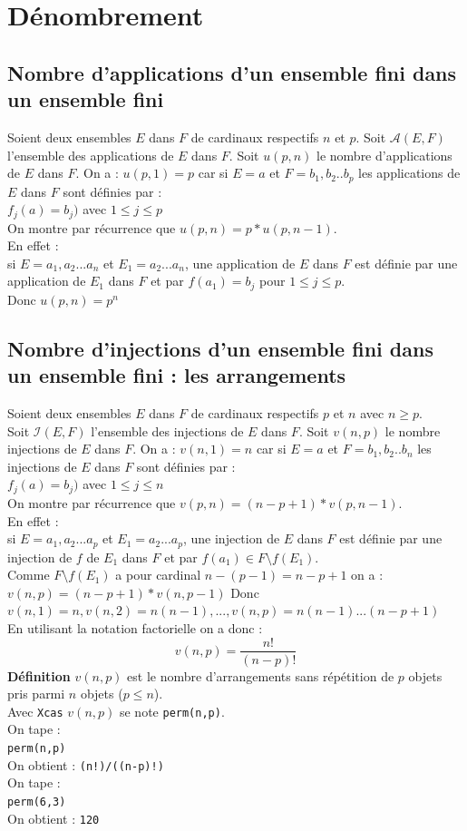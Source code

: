 \documentclass[a4paper,11pt]{book}
\begin{document}
\chapter{D\'enombrement}
\section{Nombre d'applications d'un ensemble fini dans un ensemble fini}
Soient deux ensembles $E$ dans $F$ de cardinaux respectifs $n$ et $p$.
Soit $\mathcal{A}(E,F)$ l'ensemble des applications de $E$ dans $F$.
Soit $u(p,n)$ le nombre d'applications de $E$ dans $F$.
On a :
$u(p,1)=p$ car si $E={a}$ et $F={b_1,b_2..b_p}$ les applications de $E$ dans $F$
 sont d\'efinies par :\\
$f_j(a)=b_j)$ avec $1\leq j\leq p$\\
On montre par r\'ecurrence que  $u(p,n)=p*u(p,n-1)$.\\
En effet :\\
si $E={a_1,a_2...a_n}$ et $E_1={a_2...a_n}$, une application de $E$ dans $F$ 
est d\'efinie par une application de $E_1$ dans $F$ et par $f(a_1)=b_j$ pour
$1\leq j\leq p$.\\
Donc $u(p,n)=p^n$

\section{Nombre d'injections d'un ensemble fini dans un ensemble fini : les arrangements}
Soient deux ensembles $E$ dans $F$ de cardinaux respectifs $p$ et $n$ avec 
$n\geq p$.\\
Soit $\mathcal{I}(E,F)$ l'ensemble des injections de $E$ dans $F$.
Soit $v(n,p)$ le nombre injections de $E$ dans $F$.
On a :
$v(n,1)=n$ car si $E={a}$ et $F={b_1,b_2..b_n}$ les injections de $E$ dans $F$
 sont d\'efinies par :\\
$f_j(a)=b_j)$ avec $1\leq j\leq n$\\
On montre par r\'ecurrence que  $v(p,n)=(n-p+1)*v(p,n-1)$.\\
En effet :\\
si $E={a_1,a_2...a_p}$ et $E_1={a_2...a_p}$, une injection de $E$ dans $F$ 
est d\'efinie par une injection de $f$ de $E_1$ dans $F$ et par 
$f(a_1)\in F\setminus f(E_1)$.\\
Comme $F\setminus f(E_1)$ a pour cardinal $n-(p-1)=n-p+1$ on a :\\
$v(n,p)=(n-p+1)*v(n,p-1)$
Donc $v(n,1)=n,v(n,2)=n(n-1),...,v(n,p)=n(n-1)...(n-p+1)$\\
En utilisant la notation factorielle on a donc :
$$v(n,p)=\frac{n!}{(n-p)!}$$
{\bf D\'efinition} 
$v(n,p)$ est le nombre d'arrangements sans r\'ep\'etition de $p$ objets pris 
parmi $n$ objets ($p\leq n$).\\
Avec {\tt Xcas} $v(n,p)$ se note {\tt perm(n,p)}.\\
On tape :\\
{\tt perm(n,p)}\\
On obtient :
{\tt (n!)/((n-p)!)}\\
On tape :\\
{\tt perm(6,3)}\\
On obtient :
{\tt 120}
\end{document}
